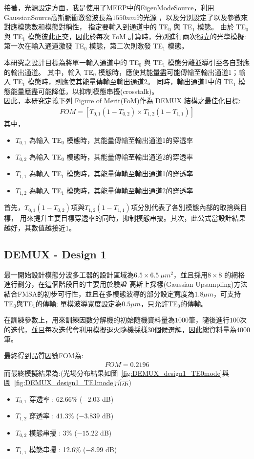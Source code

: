 接著，光源設定方面，我是使用了MEEP中的EigenModeSource，利用GaussianSource高斯脈衝激發波長為$1550 nm$的光源
，以及分別設定了以及參數來對應模態數和模態對稱性，
指定要輸入到通道中的 TE$_0$ 與 TE$_1$ 模態。
由於 TE$_0$ 與 TE$_1$ 模態彼此正交，因此於每次 FoM 計算時，分別進行兩次獨立的光學模擬:
第一次在輸入通道激發 TE$_0$ 模態，第二次則激發 TE$_1$ 模態。

本研究之設計目標為將單一輸入通道中的 TE$_0$ 與 TE$_1$ 模態分離並導引至各自對應的輸出通道。
其中，輸入 TE$_0$ 模態時，應使其能量盡可能傳輸至輸出通道1；輸入 TE$_1$ 模態時，則應使其能量傳輸至輸出通道2。
同時，輸出通道1中的 TE$_1$ 模態能量應盡可能降低，以抑制模態串擾(crosstalk)。\\
因此，本研究定義下列 Figure of Merit(FoM)作為 DEMUX 結構之最佳化目標:
\begin{align}
FOM = \left[ T_{0,1} (1 - T_{0,2}) \times T_{1,2} (1 - T_{1,1}) \right]
\label{eq:DEMUX_FoM}
\end{align}
其中，
\begin{itemize}
    \item $T_{0,1}$ 為輸入 TE$_0$ 模態時，其能量傳輸至輸出通道1的穿透率
    \item $T_{0,2}$ 為輸入 TE$_0$ 模態時，其能量傳輸至輸出通道2的穿透率
    \item $T_{1,1}$ 為輸入 TE$_1$ 模態時，其能量傳輸至輸出通道1的穿透率
    \item $T_{1,2}$ 為輸入 TE$_1$ 模態時，其能量傳輸至輸出通道2的穿透率
\end{itemize}
首先，$T_{0,1}(1 - T_{0,2})$項與$T_{1,2}(1 - T_{1,1})$項分別代表了各別模態內部的取捨與目標，
用來提升主要目標穿透率的同時，抑制模態串擾。其次，此公式當設計結果越好，其數值越接近$1$。

\subsection{DEMUX - Design 1}
\label{ch:DEMUX_design1}
最一開始設計模態分波多工器的設計區域為$6.5 \times 6.5\ \mu m^2$，並且採用$8 \times 8$ 的網格進行劃分，在這個階段目的主要用於驗證
高斯上採樣(Gaussian Upsampling)方法結合FMSA的初步可行性，並且在多模態波導的部分設定寬度為$1.8\mu m$，可支持TE$_0$與TE$_1$的傳輸;
單模波導寬度設定為$0.5\mu m$，只允許TE$_0$的傳輸。

在訓練參數上，用來訓練因數分解機的初始隨機資料量為$1000$筆，隨後進行$100$次的迭代，並且每次迭代會利用模擬退火隨機採樣$30$個候選解，因此總資料量為$4000$筆。

最終得到品質因數FOM為:
\begin{align}
FOM = 0.2196
\label{eq:DEMUX_FoM_Design1}
\end{align}
而最終模擬結果為:(光場分布結果如圖~\ref{fig:DEMUX_design1_TE0mode}與圖~\ref{fig:DEMUX_design1_TE1mode}所示)
\begin{itemize}
    \item $T_{0,1}$ 穿透率 : 62.66\% ($-2.03$ dB)
    \item $T_{1,2}$ 穿透率 : 41.3\% ($-3.839$ dB)
    \item $T_{0,2}$ 模態串擾 : 3\% ($-15.22$ dB)
    \item $T_{1,1}$ 模態串擾 : 12.6\% ($-8.99$ dB)
\end{itemize}

